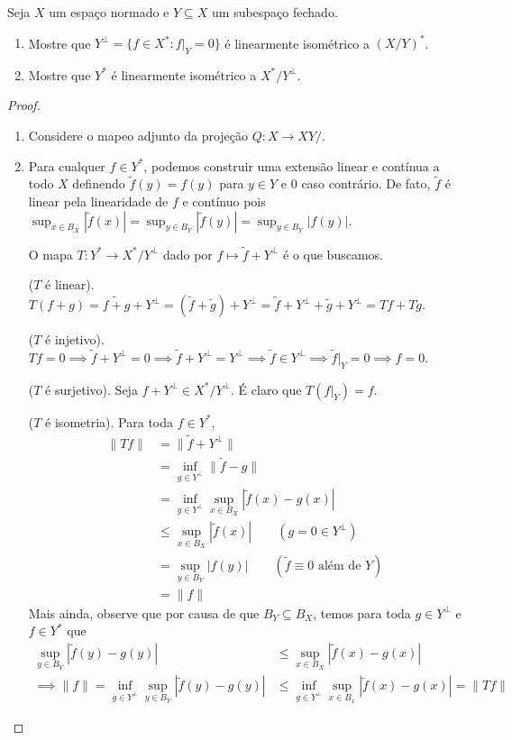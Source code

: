 \documentclass[portuguese]{article}
\theoremstyle{definition}
\begin{document}
	\begin{exer*}[5]
		Seja $X$ um espaço normado e $Y\subseteq X$ um subespaço fechado.
		\begin{enumerate}
			\item Mostre que $Y^\perp=\{f\in X^*:f|_Y=0\}$ é linearmente isométrico a $(X/Y)^*$.
			\item Mostre que $Y^*$ é linearmente isométrico a $X^*/Y^\perp$.
		\end{enumerate}
	\end{exer*}
	\begin{proof}\leavevmode
		\begin{enumerate}
			\item Considere o mapeo adjunto da projeção $Q:X\to XY/$.
			\item Para cualquer $f\in Y^*$, podemos construir uma extensão linear e contínua a todo $X$ definendo $\tilde{f}(y)=f(y)$ para $y\in Y$ e 0 caso contrário. De fato, $\tilde{f}$ é linear pela linearidade de $f$ e contínuo pois $\sup_{x\in B_X}|\tilde{f}(x)|=\sup_{y\in B_Y}|\tilde{f}(y)|=\sup_{y\in B_Y}|f(y)|$.
			
			\begin{af*}
				O mapa $T:Y^*\to X^*/Y^\perp$ dado por $f\mapsto \tilde{f}+Y^\perp$ é o que buscamos.
			\end{af*}
			($T$ é linear). $T(f+g)=\widetilde{f+g}+Y^\perp=(\tilde{f}+\tilde{g})+Y^\perp=\tilde{f}+Y^\perp + \tilde{g}+Y^\perp=Tf+Tg$.
			
			($T$ é injetivo). $Tf=0\implies \tilde{f}+Y^\perp=0\implies \tilde{f}+Y^\perp=Y^\perp\implies\tilde{f}\in Y^\perp\implies \tilde{f}|_Y=0\implies f=0$.
			
			($T$ é surjetivo). Seja $f+Y^\perp\in X^*/Y^\perp$. É claro que $T\left(f|_Y\right)=f$.
			
			($T$ é isometria). Para toda $f\in Y^*$,
			\begin{align*}
				\| Tf\|&=\| \tilde{f}+Y^\perp\|\\
				&=\inf_{g\in Y^\perp}\| \tilde{f}-g\|\\
				&=\inf_{g\in Y^\perp}\sup_{x\in B_X}|\tilde{f}(x)-g(x)|\\
				&\leq \sup_{x\in B_X}|\tilde{f}(x)|\qquad (g=0\in Y^\perp)\\
				&=\sup_{y\in B_Y}|f (y)|\qquad (\tilde{f}\equiv0\text{ além de }Y)\\
				&=\| f\|
			\end{align*}
			Mais ainda, observe que por causa de que $B_Y\subseteq B_X$, temos para toda $g\in Y^\perp$ e $f\in Y^*$ que
			\begin{align*}
				\sup_{y\in B_Y}|\tilde{f}(y)-g(y)|&\leq\sup_{x\in B_X}|\tilde{f}(x)-g(x)|\\
				\implies \| f\|=\inf_{g\in Y^\perp}\sup_{y\in B_Y}|\tilde{f}(y)-g(y)|&\leq\inf_{g\in Y^\perp}\sup_{x\in B_x}|\tilde{f}(x)-g(x)|=\| Tf\|
			\end{align*}
		\end{enumerate}
	\end{proof}
\end{document}
